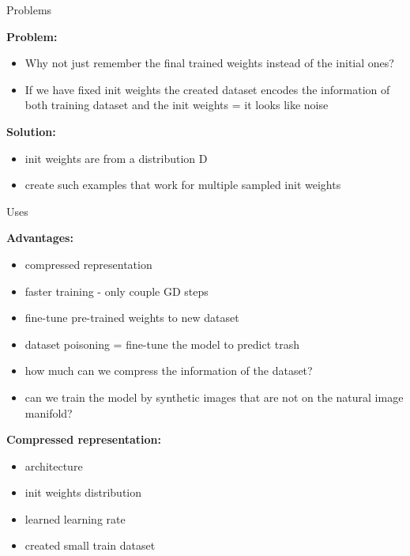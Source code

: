 \documentclass{beamer}
\begin{document}
\begin{frame}{Problems}

\textbf{Problem:}
\begin{itemize}
\item Why not just remember the final trained weights instead of the initial ones?
\item If we have fixed init weights the created dataset encodes the information of both training dataset and the init weights = it looks like noise
\end{itemize}


\vfill

\textbf{Solution:}
\begin{itemize}
\item init weights are from a distribution D
\item create such examples that work for multiple sampled init weights
\end{itemize}

\end{frame}
\begin{frame}{Uses}

\textbf{Advantages:}
\begin{itemize}
\item compressed representation
\item faster training - only couple GD steps\
\item fine-tune pre-trained weights to new dataset
\item dataset poisoning = fine-tune the model to predict trash
\item how much can we compress the information of the dataset?
\item can we train the model by synthetic images that
are not on the natural image manifold?
\end{itemize}

\vfill

\textbf{Compressed representation:}
\begin{itemize}
\item architecture
\item init weights distribution
\item learned learning rate
\item created small train dataset
\end{itemize}

\end{frame}
\end{document}
